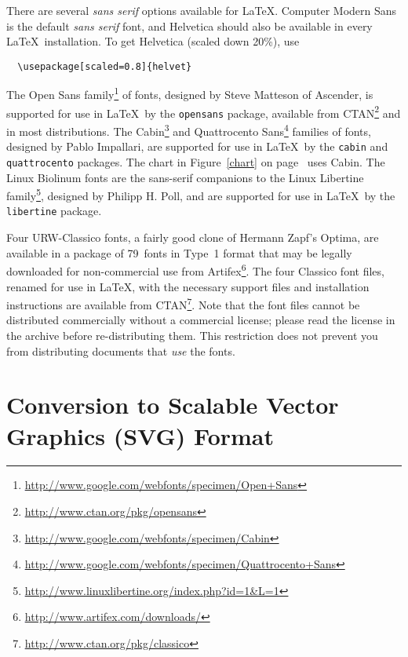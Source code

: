 \documentclass[11pt]{article}
\def\LaTeX{\mbox{LaTeX}}
\newcommand{\myurl}[1]{\textcolor{blue}{\underline{\textcolor{black}{\url{#1}}}}}
\begin{document}
There are several \emph{sans serif} options available for \LaTeX.
Computer Modern Sans is the default \emph{sans serif} font,
and Helvetica should also be available in every \LaTeX\ installation.
To get Helvetica (scaled down 20\%), use
\begin{verbatim}
  \usepackage[scaled=0.8]{helvet}
\end{verbatim}

The Open Sans family\footnote{%
\myurl{http://www.google.com/webfonts/specimen/Open+Sans}}
of  fonts, designed by Steve Matteson of
Ascender, is supported for use in \LaTeX\ by the \texttt{opensans} package,
available from CTAN\footnote{%
\myurl{http://www.ctan.org/pkg/opensans}}
and in most distributions. 
The Cabin\footnote{%
\myurl{http://www.google.com/webfonts/specimen/Cabin}}
and Quattrocento Sans\footnote{%
\myurl{http://www.google.com/webfonts/specimen/Quattrocento+Sans}
}
families of fonts, designed by Pablo Impallari, are supported for use
in \LaTeX\ by the \texttt{cabin} and \texttt{quattrocento} packages.
The chart in Figure~\ref{chart} on page~\pageref{chart} uses Cabin.
The Linux Biolinum fonts are the sans-serif
companions to the Linux Libertine family\footnote{%
\myurl{http://www.linuxlibertine.org/index.php?id=1&L=1}},
designed by Philipp H. Poll, and are supported for use in \LaTeX\ by the
\texttt{libertine} package. 

Four URW-Classico fonts, a fairly good clone of Hermann Zapf's Optima,  are available in a package
of 79~fonts in Type~1 format that may be legally downloaded for non-commercial use 
from 
Artifex\footnote{%
\myurl{http://www.artifex.com/downloads/}}.
The four Classico font files, renamed for use in \LaTeX, with the necessary support files and installation instructions are available 
from CTAN\footnote{%
\myurl{http://www.ctan.org/pkg/classico}}.
Note that the font files cannot be distributed commercially without a commercial license; please read the license in the archive
before re-distributing them. This restriction does not prevent you from distributing documents 
that \emph{use} the fonts.


\section{Conversion to Scalable Vector Graphics (SVG) Format}
\end{document}
